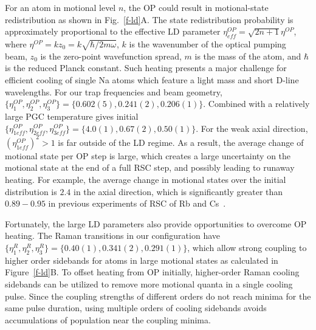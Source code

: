 \documentclass[aps,prl,twocolumn,groupedaddress]{revtex4-1}
\newcommand{\eff}{ef\! f}
\begin{document}
For an atom in motional level $n$, the OP could result in motional-state redistribution
as shown in Fig.~\ref{f-ld}A. The state redistribution probability
is approximately proportional to the effective LD parameter
$\eta^{OP}_{\eff}=\sqrt{2n+1}\eta^{OP}$, where $\eta^{OP}=k z_0=k \sqrt{\hbar/2m\omega}$,
$k$ is the wavenumber of the optical pumping beam, $z_0$ is the zero-point wavefunction spread,
$m$ is the mass of the atom, and $\hbar$ is the reduced Planck constant.
Such heating presents a major challenge for efficient cooling of single Na atoms
which feature a light mass and short D-line wavelengths.
For our trap frequencies and beam geometry,
$\{\eta^{OP}_1,\eta^{OP}_2,\eta^{OP}_3\} = \{0.602(5), 0.241(2), 0.206(1)\}$.
Combined with a relatively large PGC temperature gives initial
$\{\eta^{OP}_{1\eff},\eta^{OP}_{2\eff},\eta^{OP}_{3\eff}\} = \{4.0(1), 0.67(2), 0.50(1)\}$.
For the weak axial direction, $(\eta^{OP}_{1\eff})^2>1$ is far outside of the LD regime.
As a result, the average change of motional state per OP step is large,
which creates a large uncertainty on the motional state at the end of a full RSC step, and possibly leading to runaway heating.
For example, the average change in motional states over the initial distribution
is $2.4$ in the axial direction, which is significantly greater than $0.89-0.95$
in previous experiments of RSC of Rb and Cs~\cite{Li2012,Kaufman2012,Thompson2013,Liu2017}.

Fortunately, the large LD parameters also provide opportunities to overcome OP heating.
The Raman transitions in our configuration have
$\{\eta^R_{1},\eta^R_{2},\eta^R_{3}\} = \{0.40(1), 0.341(2), 0.291(1)\}$,
which allow strong coupling to higher order sidebands for atoms in large motional states
as calculated in Figure~\ref{f-ld}B.
To offset heating from OP initially, higher-order Raman cooling sidebands can be utilized
to remove more motional quanta in a single cooling pulse.
Since the coupling strengths of different orders do not reach minima for the same pulse duration,
using multiple orders of cooling sidebands avoids accumulations of population
near the coupling minima.
\end{document}
